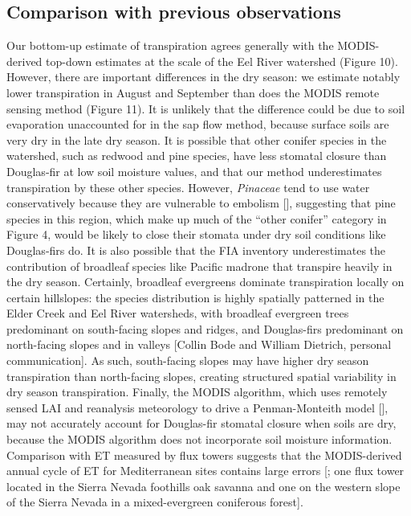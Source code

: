 \subsection{Comparison with previous observations}
Our bottom-up estimate of transpiration agrees generally with the MODIS-derived top-down estimates at the scale of the Eel River watershed (Figure 10).  However, there are important differences in the dry season: we estimate notably lower transpiration in August and September than does the MODIS remote sensing method (Figure 11).  It is unlikely that the difference could be due to soil evaporation unaccounted for in the sap flow method, because surface soils are very dry in the late dry season.  It is possible that other conifer species in the watershed, such as redwood and pine species, have less stomatal closure than Douglas-fir at low soil moisture values, and that our method underestimates transpiration by these other species.  However, \textit{Pinaceae} tend to use water conservatively because they are vulnerable to embolism [\cite{martinez2004hydraulic}], suggesting that pine species in this region, which make up much of the ``other conifer'' category in Figure 4, would be likely to close their stomata under dry soil conditions like Douglas-firs do.  It is also possible that the FIA inventory underestimates the contribution of broadleaf species like Pacific madrone that transpire heavily in the dry season.  Certainly, broadleaf evergreens dominate transpiration locally on certain hillslopes: the species distribution is highly spatially patterned in the Elder Creek and Eel River watersheds, with broadleaf evergreen trees predominant on south-facing slopes and ridges, and Douglas-firs predominant on north-facing slopes and in valleys [Collin Bode and William Dietrich, personal communication].  As such, south-facing slopes may have higher dry season transpiration than north-facing slopes, creating structured spatial variability in dry season transpiration.  Finally, the MODIS algorithm, which uses remotely sensed LAI and reanalysis meteorology to drive a Penman-Monteith model [\cite{mu2007development}], may not accurately account for Douglas-fir stomatal closure when soils are dry, because the MODIS algorithm does not incorporate soil moisture information.  Comparison with ET measured by flux towers suggests that the MODIS-derived annual cycle of ET for Mediterranean sites contains large errors [\cite{vinukollu2010global}; one flux tower located in the Sierra Nevada foothills oak savanna and one on the western slope of the Sierra Nevada in a mixed-evergreen coniferous forest].

